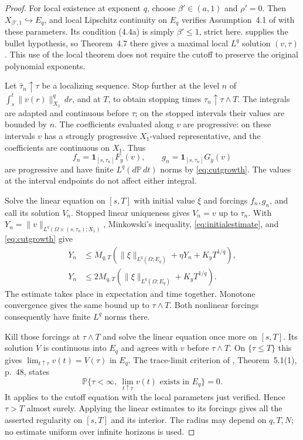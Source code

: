 \documentclass[11pt]{amsart}
\theoremstyle{definition}
\theoremstyle{remark}
\newcommand{\Prob}{\mathbb P}
\newcommand{\ind}{\mathbf 1}
\newcommand{\norm}[2][]{\lVert #2\rVert_{#1}}
\numberwithin{equation}{section}
\begin{document}
\begin{proof}
For local existence at exponent $q$, choose $\beta'\in(a,1)$ and
$\rho'=0$. Then $X_{\beta',1}\hookrightarrow E_q$, and local
Lipschitz continuity on $E_q$ verifies Assumption~4.1 of \cite{Survey}
with these parameters. Its condition (4.4a) is simply $\beta'\le1$,
strict here.  supplies the bullet hypothesis, so
Theorem~4.7 there gives a maximal local $L^q$ solution $(v,\tau)$.
This use of the local theorem does not require the cutoff to preserve
the original polynomial exponents.

Let $\widehat\tau_n\uparrow\tau$ be a localizing sequence. Stop further
at the level $n$ of $\int_s^t\norm[X_1]{v(r)}^q\,dr$, and at $T$,
to obtain stopping times $\tau_n\uparrow\tau\wedge T$. The integrals
are adapted and continuous before $\tau$; on the stopped intervals
their values are bounded by $n$. The coefficients evaluated along $v$
are progressive: on these intervals $v$ has a strongly progressive
$X_1$-valued representative, and the coefficients are continuous on
$X_1$. Thus
\[
 f_n=\ind_{[s,\tau_n]}F_y(v),\qquad
 g_n=\ind_{[s,\tau_n]}G_y(v)
\]
are progressive and have finite $L^q(d\Prob\,dt)$ norms by
\eqref{eq:cutgrowth}. The values at the interval endpoints do not
affect either integral.

Solve the linear equation on $[s,T]$ with initial value $\xi$ and
forcings $f_n,g_n$, and call its solution $V_n$. Stopped linear
uniqueness gives $V_n=v$ up to $\tau_n$. With
$Y_n=\norm[L^q(\Omega\times(s,\tau_n);X_1)]{v}$, Minkowski's
inequality, \eqref{eq:initialestimate}, and \eqref{eq:cutgrowth} give
\begin{align*}
 Y_n&\le M_{q,T}\left(\norm[L^q(\Omega;E_q)]{\xi}
                         +\eta Y_n+K_yT^{1/q}\right),\\
 Y_n&\le2M_{q,T}\left(\norm[L^q(\Omega;E_q)]{\xi}+K_yT^{1/q}\right).
\end{align*}
The estimate takes place in expectation and time together.
Monotone convergence gives the same bound up to $\tau\wedge T$.
Both nonlinear forcings consequently have finite $L^q$ norms there.

Kill those forcings at $\tau\wedge T$ and solve the linear equation
once more on $[s,T]$. Its solution $V$ is continuous into $E_q$ and
agrees with $v$ before $\tau\wedge T$. On $\{\tau\le T\}$ this gives
$\lim_{t\uparrow\tau}v(t)=V(\tau)$ in $E_q$. The trace-limit
criterion of \cite{Survey}, Theorem~5.1(1), p.~48, states
\[
 \Prob\{\tau<\infty,\ \lim_{t\uparrow\tau}v(t)
                           \text{ exists in }E_q\}=0.
\]
It applies to the cutoff equation with the local parameters just
verified. Hence $\tau>T$ almost surely. Applying the linear estimates
to its forcings gives all the asserted regularity on $[s,T]$ and its
interior. The radius may depend on $q,T,N$; no estimate uniform over
infinite horizons is used.
\end{proof}
\end{document}
